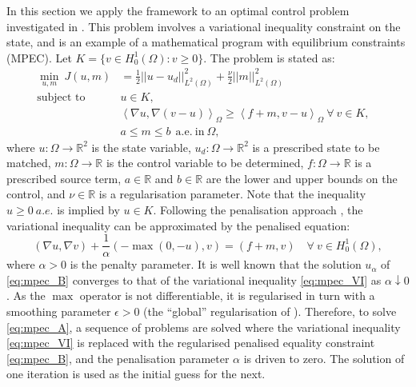 \documentclass[prodmode,acmtoms]{acmsmall}
\begin{document}
In this section we apply the framework to an optimal control problem investigated in .
This problem involves a variational inequality constraint on the state, and is an example of a mathematical program
with equilibrium constraints (MPEC). Let $K = \{v \in H^1_0(\Omega): v \ge 0\}$. The problem is stated as:
\begin{subequations}
\begin{align}
\min_{u, m}\ J(u, m) &= \frac{1}{2} \left|\left|u - u_d\right|\right|^2_{L^2(\Omega)} + \frac{\nu}{2} \left|\left|m\right|\right|^2_{L^2(\Omega)} & \\
 \textrm{subject to}\ \  & u \in K, \\
                   & \left<\nabla u, \nabla (v - u)\right>_\Omega \ge \left<f + m, v - u\right>_\Omega \ \forall \ v \in K, \label{eq:mpec_VI} \\
                   & a \le m \le b \ \ \mathrm{a.e.\ in}\ \Omega,
\end{align} \label{eq:mpec_A}\end{subequations}
where $u :\Omega \to \mathbb R^2$ is the state variable, $u_d :\Omega \to \mathbb R^2$ is a prescribed state to be matched, $m : \Omega \to \mathbb R$ is the control variable to be determined, $f :\Omega \to \mathbb R$ is a prescribed source term, $a\in \mathbb R$ and $b\in \mathbb R$ are the lower
and upper bounds on the control, and $\nu \in \mathbb R$ is a regularisation parameter. Note that the inequality $u \ge 0\ a.e.$ is implied by $u \in K$.
Following the penalisation approach \cite{tremolieres1981,hintermueller2011}, the variational inequality can be approximated by the penalised equation:
\begin{equation} \label{eq:mpec_B}
(\nabla u, \nabla v) + \frac{1}{\alpha} (-\max{(0, -u)}, v) = (f + m, v) \quad \forall \ v \in H^1_0(\Omega),
\end{equation}
where $\alpha > 0$ is the penalty parameter. It is well known that the solution $u_{\alpha}$ of \eqref{eq:mpec_B} converges to that of the
variational inequality \eqref{eq:mpec_VI} as $\alpha \downarrow 0$. As the $\max$ operator is not differentiable, it is
regularised in turn with a smoothing parameter $\epsilon > 0$ (the ``global'' regularisation of ).
Therefore, to solve \eqref{eq:mpec_A}, a sequence of problems are solved where the variational inequality \eqref{eq:mpec_VI} is replaced
with the regularised penalised equality constraint \eqref{eq:mpec_B}, and the penalisation parameter $\alpha$ is driven to zero. The
solution of one iteration is used as the initial guess for the next.
\end{document}
